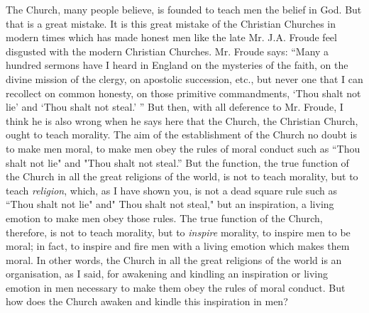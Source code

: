 The Church, many people believe, is founded to teach men the belief in God.
But that is a great mistake. It is this great mistake of the Christian Churches in modern times which has made honest men like the late Mr. J.A. Froude feel disgusted with the modern Christian Churches.
Mr. Froude says:
``Many a hundred sermons have I heard in England on the mysteries of the faith, on the divine mission of the clergy, on apostolic succession, etc.,
but never one that I can recollect on common honesty, on those primitive commandments,
`Thou shalt not lie' and `Thou shalt not steal.' ''
But then, with all deference to Mr. Froude, I think he is also wrong when he says here that the Church, the Christian Church, ought to teach morality.
The aim of the establishment of the Church no doubt is to make men moral, to make men obey the rules of moral conduct such as ``Thou shalt not lie" and "Thou shalt not steal.''
But the function, the true function of the Church in all the great religions of the world, is not to teach morality, but to teach \emph{religion},
which, as I have shown you, is not a dead square rule such as ``Thou shalt not lie" and" Thou shalt not steal," but an inspiration, a living emotion to make men obey those rules.
The true function of the Church, therefore, is not to teach morality,
but to \emph{inspire} morality, to inspire men to be moral;
in fact, to inspire and fire men with a living emotion which makes them moral.
In other words, the Church in all the great religions of the world is an organisation, as I said, for awakening and kindling an inspiration or living emotion in men necessary to make them obey the rules of moral conduct.
But how does the Church awaken and kindle this inspiration in men?

